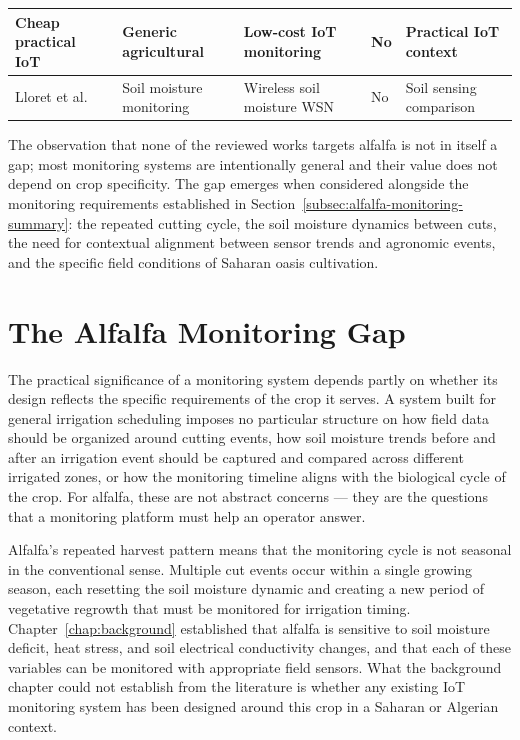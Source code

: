 \begin{table}[H]
\begin{tabular}{|p{3.8cm}|p{2.4cm}|p{3.6cm}|p{1.4cm}|p{2.0cm}|}
    \hline
    Cheap practical IoT~\cite{cheap_practical_iot_agri_monitoring} &
    Generic agricultural &
    Low-cost IoT monitoring &
    No & Practical IoT context \\
    \hline
    Lloret et al.~\cite{lloret2021soil_moisture_wsn} &
    Soil moisture monitoring &
    Wireless soil moisture WSN &
    No & Soil sensing comparison \\
    \hline
  \end{tabular}
\end{table}

The observation that none of the reviewed works targets alfalfa is not in
itself a gap; most monitoring systems are intentionally general and their
value does not depend on crop specificity. The gap emerges when considered
alongside the monitoring requirements established in
Section~\ref{subsec:alfalfa-monitoring-summary}: the repeated cutting cycle,
the soil moisture dynamics between cuts, the need for contextual alignment
between sensor trends and agronomic events, and the specific field conditions
of Saharan oasis cultivation.

\section{The Alfalfa Monitoring Gap}
\label{sec:alfalfa-gap}

The practical significance of a monitoring system depends partly on whether
its design reflects the specific requirements of the crop it serves. A system
built for general irrigation scheduling imposes no particular structure on how
field data should be organized around cutting events, how soil moisture trends
before and after an irrigation event should be captured and compared across
different irrigated zones, or how the monitoring timeline aligns with the
biological cycle of the crop. For alfalfa, these are not abstract concerns ---
they are the questions that a monitoring platform must help an operator answer.

Alfalfa's repeated harvest pattern means that the monitoring cycle is not
seasonal in the conventional sense. Multiple cut events occur within a single
growing season, each resetting the soil moisture dynamic and creating a new
period of vegetative regrowth that must be monitored for irrigation timing.
Chapter~\ref{chap:background} established that alfalfa is sensitive to soil
moisture deficit, heat stress, and soil electrical conductivity changes, and
that each of these variables can be monitored with appropriate field sensors.
What the background chapter could not establish from the literature is whether
any existing IoT monitoring system has been designed around this crop in a
Saharan or Algerian context.

